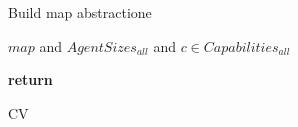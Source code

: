 \begin{algorithm}
\caption{Build map abstractione}
\label{aha-alg:buildabstraction}
\begin{algorithmic}
\REQUIRE $map$ and $AgentSizes_{all}$ and $c \in Capabilities_{all}$

	\STATE \textbf{return}

\caption{CV}
\label{alg_ccv}
\end{algorithmic}
\end{algorithm}
